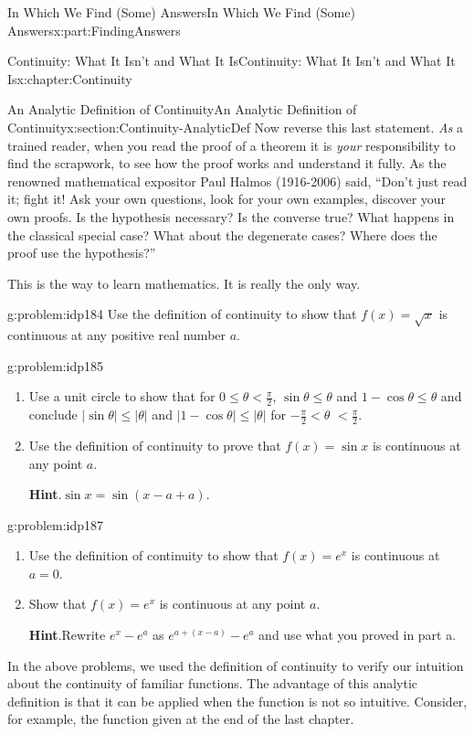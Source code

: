 \documentclass[oneside,10pt,]{book}
\newcommand{\blocktitlefont}{\relax}
\numberwithin{equation}{section}
\newcommand{\abs}[1]{\left|#1\right|}
\newcommand{\lt}{<}
\begin{document}
\begin{partptx}{In Which We Find (Some) Answers}{}{In Which We Find (Some) Answers}{}{}{x:part:FindingAnswers}
\begin{chapterptx}{Continuity: What It Isn't and What It Is}{}{Continuity: What It Isn't and What It Is}{}{}{x:chapter:Continuity}
\begin{sectionptx}{An Analytic Definition of Continuity}{}{An Analytic Definition of Continuity}{}{}{x:section:Continuity-AnalyticDef}
Now reverse this last statement.  \emph{As} a trained reader, when you read the proof of a theorem it is \emph{your} responsibility to find the scrapwork, to see how the proof works and understand it fully.  As the renowned mathematical expositor Paul Halmos  (1916-2006) said, ``Don't just read it; fight it! Ask your own questions, look for your own examples, discover your own proofs. Is the hypothesis necessary? Is the converse true? What happens in the classical special case? What about the degenerate cases? Where does the proof use the hypothesis?''%
\par
This is the way to learn mathematics.  It is really the only way.%
\begin{problem}{}{g:problem:idp184}%
Use the definition of continuity to show that \(f(x)=\sqrt{x}\) is continuous at any positive real number \(a\).%
\end{problem}
\begin{problem}{}{g:problem:idp185}%
\begin{enumerate}[font=\bfseries,label=(\alph*),ref=\alph*]
\item{}Use a unit circle to show that for \(0\leq\theta\lt
\frac{\pi}{2}\), \(\sin \theta\leq\theta\) and \(1-\cos \theta\leq\theta\) and conclude \(\abs{\sin
\theta}\leq\abs{\theta}\) and \(\abs{1-\cos
\theta}\leq\abs{\theta}\) for \(-\frac{\pi}{2}\lt
\theta\) \(\lt \frac{\pi}{2}\).%
\item{}Use the definition of continuity to prove that \(f(x)=\sin x\) is continuous at any point \(a\).%
\par\smallskip%
\noindent\textbf{\blocktitlefont Hint}.\hypertarget{g:hint:idp186}{}\quad{}\(\sin x=\sin\left(x-a+a\right)\).%
\end{enumerate}
\end{problem}
\begin{problem}{}{g:problem:idp187}%
\begin{enumerate}[font=\bfseries,label=(\alph*),ref=\alph*]
\item{}Use the definition of continuity to show that \(f(x)=e^x\) is continuous at \(a=0\).%
\item{}Show that \(f(x)=e^x\) is continuous at any point \(a\).%
\par\smallskip%
\noindent\textbf{\blocktitlefont Hint}.\hypertarget{g:hint:idp188}{}\quad{}Rewrite \(e^x-e^a\) as \(e^{a+(x-a)}-e^a\) and use what you proved in part a.%
\end{enumerate}
\end{problem}
In the above problems, we used the definition of continuity to verify our intuition about the continuity of familiar functions.  The advantage of this analytic definition is that it can be applied when the function is not so intuitive.  Consider, for example, the function given at the end of the last chapter.%

\end{sectionptx}
\end{chapterptx}
\end{partptx}
\end{document}
